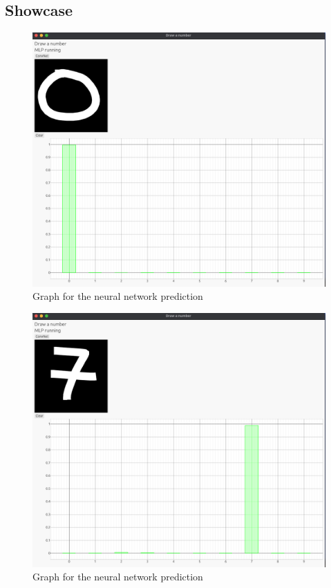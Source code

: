 \documentclass[a4paper, twocolumn, twoside]{article}
\begin{document}
	\subsection{Showcase}
	\begin{figure}[H]
	\begin{center}
		\includegraphics[width=\columnwidth]{images/0_final.png}
	\end{center}
	\caption{Graph for the neural network prediction}
	\end{figure}
	\begin{figure}[H]
	\begin{center}
		\includegraphics[width=\columnwidth]{images/7_final.png}
	\end{center}
	\caption{Graph for the neural network prediction}
	\end{figure}
\end{document}
